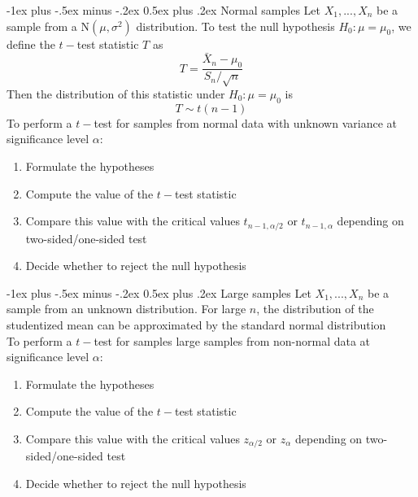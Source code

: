 \documentclass[10pt,landscape,a4paper]{article}
\makeatletter
\renewcommand{\section}{\@startsection{section}{1}{0mm}%
	{-1ex plus -.5ex minus -.2ex}%
	{0.5ex plus .2ex}%
	{\normalfont\large\bfseries}}
\makeatother
\begin{document}
\begin{multicols}{3}
		\section{Normal samples}
		Let $X_1,...,X_n$ be a sample from a $\mathrm{N}(\mu, \sigma^2)$ distribution.
		To test the null hypothesis $H_0: \mu = \mu_0$, we define the $t-$test
		statistic $T$ as
		\begin{equation*}
			T=\frac{\bar{X}_n - \mu_0}{S_n / \sqrt{n}}
		\end{equation*} 
		Then the distribution of this statistic under $H_0: \mu = \mu_0$ is
		\begin{equation*}
			T \sim t(n-1)
		\end{equation*}
		To perform a $t-$test for samples from normal data with unknown variance
		at significance level $\alpha$:
		\begin{enumerate}
			\item Formulate the hypotheses
			\item Compute the value of the $t-$test statistic
			\item Compare this value with the critical values $t_{n-1,\alpha/2}$ or
			$t_{n-1,\alpha}$ depending on two-sided/one-sided test
			\item Decide whether to reject the null hypothesis
		\end{enumerate}
		
		\section{Large samples}
		Let $X_1,...,X_n$ be a sample from an unknown distribution. For large $n$, the
		distribution of the studentized mean can be approximated by the standard
		normal distribution \\
		To perform a $t-$test for samples large samples from non-normal data
		at significance level $\alpha$:
		\begin{enumerate}
			\item Formulate the hypotheses
			\item Compute the value of the $t-$test statistic
			\item Compare this value with the critical values $z_{\alpha/2}$ or
			$z_{\alpha}$ depending on two-sided/one-sided test
			\item Decide whether to reject the null hypothesis
		\end{enumerate}
		
	\end{multicols}
\end{document}
